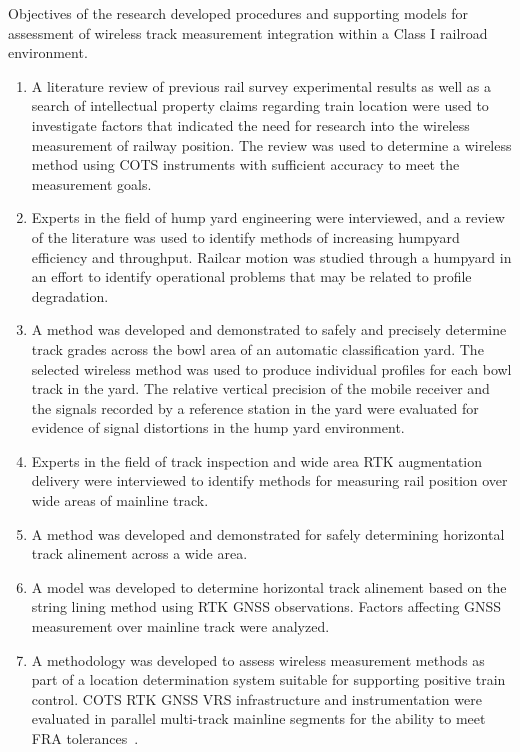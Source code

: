 Objectives of the research developed procedures and supporting models for assessment of wireless track measurement integration within a Class I railroad environment.
\begin{enumerate}
\firmlist
\item A literature review of previous rail survey experimental results as well as a search of intellectual property claims regarding train location were used to investigate factors that indicated the need for research into the wireless measurement of railway position. The review was used to determine a wireless method using COTS instruments with sufficient accuracy to meet the measurement goals.
\item Experts in the field of hump yard engineering were interviewed, and a review of the literature was used to identify methods of increasing humpyard efficiency and throughput. Railcar motion was studied through a humpyard in an effort to identify operational problems that may be related to profile degradation.
\item A method was developed and demonstrated to safely and precisely determine track grades across the bowl area of an automatic classification yard. The selected wireless method was used to produce individual profiles for each bowl track in the yard. The relative vertical precision of the mobile receiver and the signals recorded by a reference station in the yard were evaluated for evidence of signal distortions in the hump yard environment.
\item Experts in the field of track inspection and wide area RTK augmentation delivery were interviewed to identify methods for measuring rail position over wide areas of mainline track.
\item A method was developed and demonstrated for safely determining horizontal track alinement across a wide area.
\item A model was developed to determine horizontal track alinement based on the string lining method using RTK GNSS observations. Factors affecting GNSS measurement over mainline track were analyzed.
\item A methodology was developed to assess wireless measurement methods as part of a location determination system suitable for supporting positive train control. COTS RTK GNSS VRS infrastructure and instrumentation were evaluated in parallel multi-track mainline segments for the ability to meet FRA tolerances~\cite[4-5]{1995FRADiffe}.
\end{enumerate}

